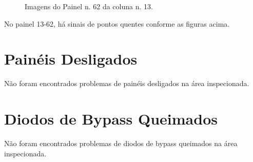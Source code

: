 \documentclass[dvipsnames]{article}%
\begin{document}
\begin{figure}[h!]%
\centering%
%
\hfill%
%
\hfill%
%
\caption{Imagens do Painel n. 62 da coluna n. 13.}%
\end{figure}

%
\FloatBarrier%
No painel 13{-}62, há sinais de pontos quentes conforme as figuras acima.\newline%
%
\newpage%
\section{Painéis Desligados}%
Não foram encontrados problemas de painéis desligados na área inspecionada.\newline%
%
\newpage%
\section{Diodos de Bypass Queimados}%
Não foram encontrados problemas de diodos de bypass queimados na área inspecionada.\newline%
%
\end{document}
